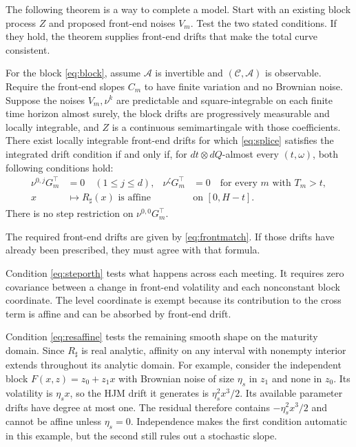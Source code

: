The following theorem is a way to complete a model. Start with an existing block process $Z$ and proposed front-end noises $V_m$. Test the two stated conditions. If they hold, the theorem supplies front-end drifts that make the total curve consistent.

\begin{theorem}\label{thm:splice}
For the block \eqref{eq:block}, assume $\mathcal A$ is invertible and $(\mathcal C,\mathcal A)$ is observable. Require the front-end slopes $C_m$ to have finite variation and no Brownian noise. Suppose the noises $V_m,\nu^k$ are predictable and square-integrable on each finite time horizon almost surely, the block drifts are progressively measurable and locally integrable, and $Z$ is a continuous semimartingale with those coefficients. There exist locally integrable front-end drifts for which \eqref{eq:splice} satisfies the integrated drift condition if and only if, for $dt\otimes dQ$-almost every $(t,\omega)$, both following conditions hold:
\begin{align}
\nu^{0,j}G_m^\top&=0\quad(1\le j\le d),&
\nu^\zeta G_m^\top&=0 \quad\text{for every }m\text{ with }T_m>t,\label{eq:steporth}\\
x&\longmapsto R_\sharp(x)\text{ is affine}
&&\text{on }[0,H-t].\label{eq:resaffine}
\end{align}
There is no step restriction on $\nu^{0,0}G_m^\top$.

The required front-end drifts are given by \eqref{eq:frontmatch}. If those drifts have already been prescribed, they must agree with that formula.
\end{theorem}

Condition \eqref{eq:steporth} tests what happens across each meeting. It requires zero covariance between a change in front-end volatility and each nonconstant block coordinate. The level coordinate is exempt because its contribution to the cross term is affine and can be absorbed by front-end drift.

Condition \eqref{eq:resaffine} tests the remaining smooth shape on the maturity domain. Since $R_\sharp$ is real analytic, affinity on any interval with nonempty interior extends throughout its analytic domain. For example, consider the independent block $F(x,z)=z_0+z_1x$ with Brownian noise of size $\eta_s$ in $z_1$ and none in $z_0$. Its volatility is $\eta_s x$, so the HJM drift it generates is $\eta_s^2x^3/2$. Its available parameter drifts have degree at most one. The residual therefore contains $-\eta_s^2x^3/2$ and cannot be affine unless $\eta_s=0$. Independence makes the first condition automatic in this example, but the second still rules out a stochastic slope.

